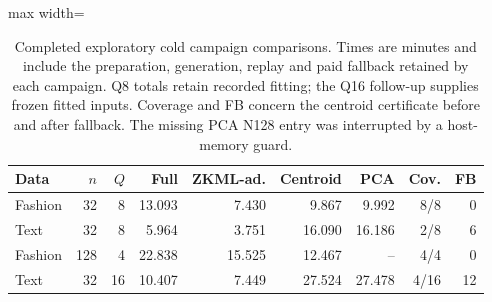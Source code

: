 \begin{table}[tbp]
\centering
\small
\caption{Completed exploratory cold campaign comparisons. Times are minutes and include the preparation, generation, replay and paid fallback retained by each campaign. Q8 totals retain recorded fitting; the Q16 follow-up supplies frozen fitted inputs. Coverage and FB concern the centroid certificate before and after fallback. The missing PCA N128 entry was interrupted by a host-memory guard.}
\label{tab:ccd-cold}
\begin{adjustbox}{max width=\textwidth}
\begin{tabular*}{.98\textwidth}{@{\extracolsep{\fill}}lrrrrrrrr@{}}
\toprule
Data & $n$ & $Q$ & Full & ZKML-ad. & Centroid & PCA & Cov. & FB\\
\midrule
Fashion & 32 & 8 & 13.093 & 7.430 & 9.867 & 9.992 & 8/8 & 0\\
Text & 32 & 8 & 5.964 & 3.751 & 16.090 & 16.186 & 2/8 & 6\\
Fashion & 128 & 4 & 22.838 & 15.525 & 12.467 & -- & 4/4 & 0\\
Text & 32 & 16 & 10.407 & 7.449 & 27.524 & 27.478 & 4/16 & 12\\
\bottomrule
\end{tabular*}
\end{adjustbox}
\end{table}
